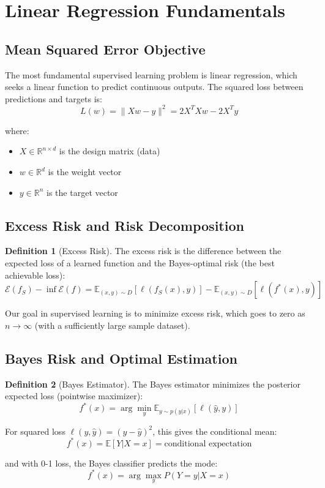 \documentclass[12pt,a4paper]{article}
\theoremstyle{definition}
\newtheorem{definition}{Definition}[section]
\begin{document}
\newpage

\section{Linear Regression Fundamentals}

\subsection{Mean Squared Error Objective}

The most fundamental supervised learning problem is linear regression, which seeks a linear function to predict continuous outputs. The squared loss between predictions and targets is:
\[
L(w) = \|Xw - y\|^2 = 2X^T X w - 2X^T y
\]

where:
\begin{itemize}
    \item $X \in \mathbb{R}^{n \times d}$ is the design matrix (data)
    \item $w \in \mathbb{R}^d$ is the weight vector
    \item $y \in \mathbb{R}^n$ is the target vector
\end{itemize}

\subsection{Excess Risk and Risk Decomposition}

\begin{definition}[Excess Risk]
The excess risk is the difference between the expected loss of a learned function and the Bayes-optimal risk (the best achievable loss):
\[
\mathcal{E}(f_S) - \inf \mathcal{E}(f) = \mathbb{E}_{(x,y) \sim D} [\ell(f_S(x), y)] - \mathbb{E}_{(x,y) \sim D} [\ell(f^*(x), y)]
\]

Our goal in supervised learning is to minimize excess risk, which goes to zero as $n \to \infty$ (with a sufficiently large sample dataset).
\end{definition}

\subsection{Bayes Risk and Optimal Estimation}

\begin{definition}[Bayes Estimator]
The Bayes estimator minimizes the posterior expected loss (pointwise maximizer):
\[
f^*(x) = \arg\min_y \mathbb{E}_{y \sim p(y|x)} [\ell(\hat{y}, y)]
\]

For squared loss $\ell(y, \hat{y}) = (y - \hat{y})^2$, this gives the conditional mean:
\[
f^*(x) = \mathbb{E}[Y | X = x] = \text{conditional expectation}
\]

and with 0-1 loss, the Bayes classifier predicts the mode:
\[
f^*(x) = \arg\max_y P(Y = y | X = x)
\]
\end{definition}
\end{document}
